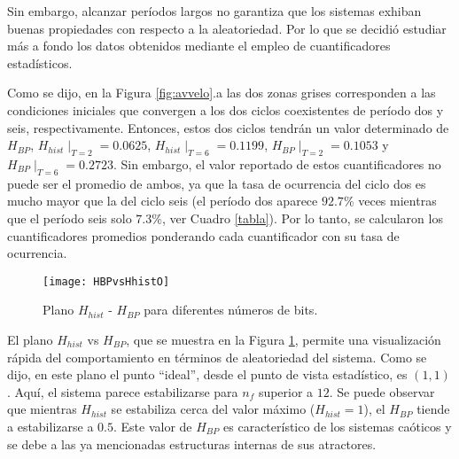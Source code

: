 Sin embargo, alcanzar períodos largos no garantiza que los sistemas exhiban buenas propiedades con respecto a la aleatoriedad.
Por lo que se decidió estudiar más a fondo los datos obtenidos mediante el empleo de cuantificadores estadísticos.

Como se dijo, en la Figura \ref{fig:avvelo}.a las dos zonas grises corresponden a las condiciones iniciales que convergen a los dos ciclos coexistentes de período dos y seis, respectivamente.
Entonces, estos dos ciclos tendrán un valor determinado de  $H_{BP}$, $H_{hist}\mid_{T=2}=0.0625$, $H_{hist}\mid_{T=6}=0.1199$, $H_{BP}\mid_{T=2}=0.1053$ y $H_{BP} \mid_{T = 6} = 0.2723 $.
Sin embargo, el valor reportado de estos cuantificadores no puede ser el promedio de ambos, ya que la tasa de ocurrencia del ciclo dos es mucho mayor que la del ciclo seis (el período dos aparece $92.7 \%$ veces mientras que el período seis solo $7.3 \%$, ver Cuadro \ref{tabla}).
Por lo tanto, se calcularon los cuantificadores promedios ponderando cada cuantificador con su tasa de ocurrencia.
%
\begin{figure}
	\centering
	\texttt{[image: HBPvsHhistO]}\\
	\caption{Plano $H_{hist}$ - $H_{BP}$ para diferentes números de bits. }\label{fig:HBPvsHhist}
\end{figure}

El plano $H_{hist}$ vs $H_{BP}$, que se muestra en la Figura \ref{fig:HBPvsHhist}, permite una visualización rápida del comportamiento en términos de aleatoriedad del sistema.
Como se dijo, en este plano el punto ``ideal'', desde el punto de vista estadístico, es $(1,1)$.
Aquí, el sistema parece estabilizarse para $n_f$ superior a $12$.
Se puede observar que mientras $H_{hist}$ se estabiliza cerca del valor máximo ($ H_{hist} = 1 $), el $H_{BP}$ tiende a estabilizarse a $0.5$.
Este valor de $ H_{BP} $ es característico de los sistemas caóticos y se debe a las ya mencionadas estructuras internas de sus atractores.


